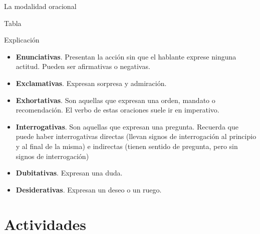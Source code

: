 \documentclass[ignorenonframetext,]{beamer}
\providecommand{\tightlist}{%
  \setlength{\itemsep}{0pt}\setlength{\parskip}{0pt}}
\begin{document}
\begin{frame}{La modalidad oracional}
\begin{block}{Tabla}
\end{block}

\begin{block}{Explicación}

\begin{itemize}
\tightlist
\item
  \textbf{Enunciativas}. Presentan la acción sin que el hablante exprese
  ninguna actitud. Pueden ser afirmativas o negativas.
\item
  \textbf{Exclamativas}. Expresan sorpresa y admiración.
\item
  \textbf{Exhortativas}. Son aquellas que expresan una orden, mandato o
  recomendación. El verbo de estas oraciones suele ir en imperativo.
\item
  \textbf{Interrogativas}. Son aquellas que expresan una pregunta.
  Recuerda que puede haber interrogativas directas (llevan signos de
  interrogación al principio y al final de la misma) e indirectas
  (tienen sentido de pregunta, pero sin signos de interrogación)
\item
  \textbf{Dubitativas}. Expresan una duda.
\item
  \textbf{Desiderativas}. Expresan un deseo o un ruego.
\end{itemize}

\end{block}

\end{frame}

\hypertarget{actividades}{%
\section{Actividades}\label{actividades}}
\end{document}
